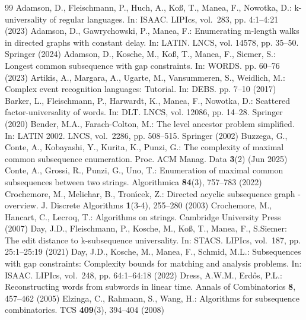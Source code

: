 \documentclass[10pt,a4paper]{amsart}
\theoremstyle{plain}
\theoremstyle{definition}
\begin{document}
\begin{thebibliography}{99}
 Adamson, D., Fleischmann, P., Huch, A., Ko{\ss}, T., Manea, F., Nowotka, D.: k-universality of regular languages. In: {ISAAC}. LIPIcs, vol.~283, pp. 4:1--4:21 (2023)
 Adamson, D., Gawrychowski, P., Manea, F.: Enumerating m-length walks in directed graphs with constant delay. In: {LATIN}. LNCS, vol. 14578, pp. 35--50. Springer (2024)
 Adamson, D., Kosche, M., Ko{\ss}, T., Manea, F., Siemer, S.: Longest common subsequence with gap constraints. In: WORDS. pp. 60--76 (2023)
 Artikis, A., Margara, A., Ugarte, M., Vansummeren, S., Weidlich, M.: Complex event recognition languages: Tutorial. In: DEBS. pp. 7--10 (2017)
 Barker, L., Fleischmann, P., Harwardt, K., Manea, F., Nowotka, D.: Scattered factor-universality of words. In: {DLT}. LNCS, vol. 12086, pp. 14--28. Springer (2020)
 Bender, M.A., Farach{-}Colton, M.: The level ancestor problem simplified. In: {LATIN} 2002. LNCS, vol.~2286, pp. 508--515. Springer (2002)
 Buzzega, G., Conte, A., Kobayashi, Y., Kurita, K., Punzi, G.: The complexity of maximal common subsequence enumeration. Proc. ACM Manag. Data \textbf{3}(2) (Jun 2025)
 Conte, A., Grossi, R., Punzi, G., Uno, T.: Enumeration of maximal common subsequences between two strings. Algorithmica \textbf{84}(3), 757--783 (2022)
 Crochemore, M., Melichar, B., Tron{\'{\i}}cek, Z.: Directed acyclic subsequence graph - overview. J. Discrete Algorithms \textbf{1}(3-4), 255--280 (2003)
 Crochemore, M., Hancart, C., Lecroq, T.: Algorithms on strings. Cambridge University Press (2007)
 Day, J.D., Fleischmann, P., Kosche, M., Ko{\ss}, T., Manea, F., S.Siemer: The edit distance to k-subsequence universality. In: {STACS}. LIPIcs, vol.~187, pp. 25:1--25:19 (2021)
 Day, J.D., Kosche, M., Manea, F., Schmid, M.L.: Subsequences with gap constraints: Complexity bounds for matching and analysis problems. In: {ISAAC}. LIPIcs, vol.~248, pp. 64:1--64:18 (2022)
 Dress, A.W.M., Erd{\H{o}}s, P.L.: Reconstructing words from subwords in linear time. Annals of Combinatorics \textbf{8}, 457--462 (2005)
 Elzinga, C., Rahmann, S., Wang, H.: Algorithms for subsequence combinatorics. TCS \textbf{409}(3), 394--404 (2008)

\end{thebibliography}
\end{document}
